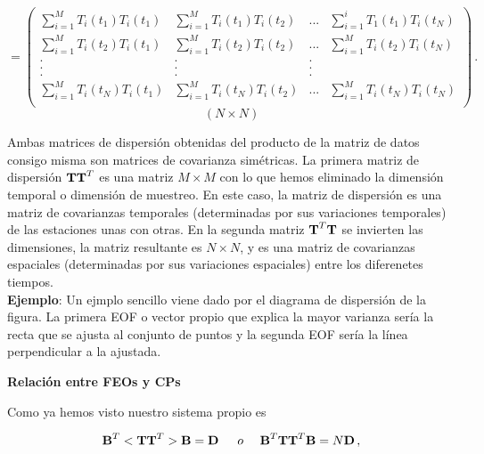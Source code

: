 \documentclass[
]{agujournal2019}
\begin{document}
\[=\left(\begin{array}{cccc}
   \sum\limits_{i=1}^M{T_{i}(t_1)T_{i}(t_1)} & \sum\limits_{i=1}^M{T_{i}(t_1)T_{i}(t_2)} & ... & \sum\limits_{i=1}^i{T_{1}(t_1)T_{i}(t_N)}\\
   \sum\limits_{i=1}^M{T_{i}(t_2)T_{i}(t_1)} & \sum\limits_{i=1}^M{T_{i}(t_2)T_{i}(t_2)} & ... & \sum\limits_{i=1}^M{T_{i}(t_2)T_{i}(t_N)}\\
        . & . & . \\
        . & . & . \\
        . & . & . \\
   \sum\limits_{i=1}^M{T_{i}(t_N)T_{i}(t_1)} & \sum\limits_{i=1}^M{T_{i}(t_N)T_{i}(t_2)} & ... & \sum\limits_{i=1}^M{T_{i}(t_N)T_{i}(t_N)}\\
        \end{array}\right)\,.\] \[\left( N \times N \right)\]

Ambas matrices de dispersión obtenidas del producto de la matriz de
datos consigo misma son matrices de covarianza simétricas. La primera
matriz de dispersión \({\textbf T}{\textbf T}^T\) es una matriz
\(M \times M\) con lo que hemos eliminado la dimensión temporal o
dimensión de muestreo. En este caso, la matriz de dispersión es una
matriz de covarianzas temporales (determinadas por sus variaciones
temporales) de las estaciones unas con otras. En la segunda matriz
\({\textbf T}^T{\textbf T}\) se invierten las dimensiones, la matriz
resultante es \(N\times N\), y es una matriz de covarianzas espaciales
(determinadas por sus variaciones espaciales) entre los diferenetes
tiempos.\\

\textbf{Ejemplo}: Un ejmplo sencillo viene dado por el diagrama de
dispersión de la figura. La primera EOF o vector propio que explica la
mayor varianza sería la recta que se ajusta al conjunto de puntos y la
segunda EOF sería la línea perpendicular a la ajustada.

\begin{center}
\end{center}

\vspace{0.25cm}

\textbf{Relación entre FEOs y CPs}

Como ya hemos visto nuestro sistema propio es

\[{\textbf B}^T<{\textbf T}{\textbf T}^T>{\textbf B}={\textbf D}\,\,\,\,\,\,\,\,\,{ o}\,\,\,\,\,\,\,\,{\textbf B}^T{\textbf T}{\textbf T}^T{\textbf B}=N{\textbf D}\,,\]
\end{document}
